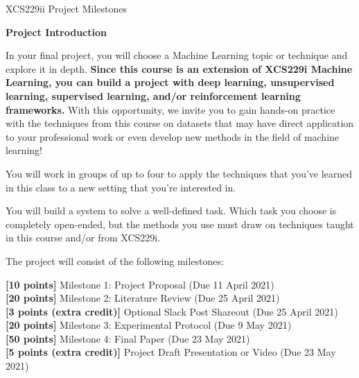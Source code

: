 



\pagestyle{myheadings} 

\huge\noindent XCS229ii Project Milestones


\large
\textbf{Project Introduction}\vspace{\baselineskip}

\normalsize
In your final project, you will choose a Machine Learning topic or technique and explore it in depth. \textbf{Since this course is an extension of XCS229i Machine Learning, you can build a project with deep learning, unsupervised learning, supervised learning, and/or reinforcement learning frameworks.} With this opportunity, we invite you to gain hands-on practice with the techniques from this course on datasets that may have direct application to your professional work or even develop new methods in the field of machine learning!\vspace{\baselineskip}

You will work in groups of up to four to apply the techniques that you've learned in this class to a new setting that you're interested in.\vspace{\baselineskip}

You will build a system to solve a well-defined task. Which task you choose is completely open-ended, but the methods you use must draw on techniques taught in this course and/or from XCS229i. \vspace{\baselineskip}

The project will consist of the following milestones:

\textbf{[10 points]} Milestone 1: Project Proposal (Due 11 April 2021)\\
\textbf{[20 points]} Milestone 2: Literature Review (Due 25 April 2021)\\
\textbf{[3 points (extra credit)]} Optional Slack Post Shareout (Due 25 April 2021)\\
\textbf{[20 points]} Milestone 3: Experimental Protocol (Due 9 May 2021)\\
\textbf{[50 points]} Milestone 4: Final Paper (Due 23 May 2021)\\
\textbf{[5 points (extra credit)]} Project Draft Presentation or Video (Due 23 May 2021)\\

\vspace{\baselineskip}
\vspace{\baselineskip}

